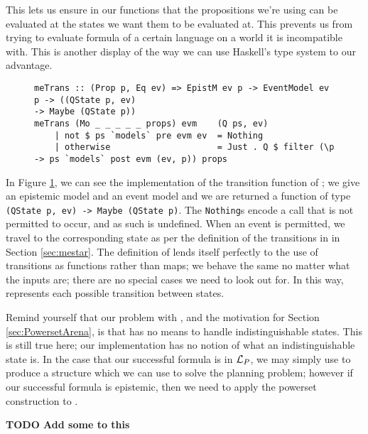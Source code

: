\documentclass[10pt, a4paper]{report}
\begin{document}
This lets us ensure in our functions that the propositions we're using can be
evaluated at the states we want them to be evaluated at. This prevents us from
trying to evaluate formula of a certain language on a world it is incompatible
with. This is another display of the way we can use Haskell's type system to our
advantage. 

\begin{figure}[h]
\begin{verbatim}
meTrans :: (Prop p, Eq ev) => EpistM ev p -> EventModel ev p -> ((QState p, ev)
-> Maybe (QState p))
meTrans (Mo _ _ _ _ _ props) evm    (Q ps, ev)
    | not $ ps `models` pre evm ev  = Nothing
    | otherwise                     = Just . Q $ filter (\p -> ps `models` post evm (ev, p)) props
\end{verbatim}
  \caption{}
  \label{fig:metrans}
\end{figure}

In Figure \ref{fig:metrans}, we can see the implementation of the transition
function of \mestar; we give an epistemic model and an event model and we are
returned a function of type \texttt{(QState p, ev) -> Maybe (QState
  p)}. The \texttt{Nothing}s encode a call that is not permitted to
occur, and as such is undefined. When an event is permitted, we travel to the
corresponding state as per the definition of the transitions in \mestar in
Section \ref{sec:mestar}. The definition of \mestar lends itself perfectly to
the use of transitions as functions rather than maps; we behave the same no
matter what the inputs are; there are no special cases we need to look out for.
In this way, \mestar represents each possible transition between states. 

Remind yourself that our problem with \mestar, and the motivation for Section
\ref{sec:PowersetArena}, is that \mestar has no means to handle
indistinguishable states. This is still true here; our implementation has no
notion of what an indistinguishable state is. In the case that our successful
formula is in $\mathcal{L}_P$, we may simply use \mestar to produce a structure which
we can use to solve the planning problem; however if our successful formula is
epistemic, then we need to apply the powerset construction to \mestar. 

\textbf{TODO Add some to this}

\section{}
\end{document}
